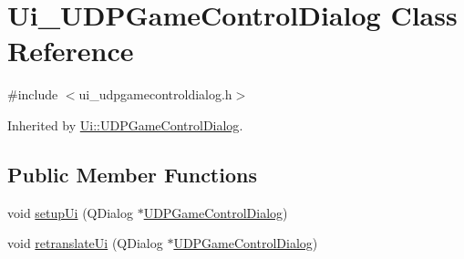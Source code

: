 \hypertarget{class_ui___u_d_p_game_control_dialog}{\section{Ui\-\_\-\-U\-D\-P\-Game\-Control\-Dialog Class Reference}
\label{class_ui___u_d_p_game_control_dialog}
}


{\ttfamily \#include $<$ui\-\_\-udpgamecontroldialog.\-h$>$}



Inherited by \hyperlink{class_ui_1_1_u_d_p_game_control_dialog}{Ui\-::\-U\-D\-P\-Game\-Control\-Dialog}.

\subsection*{Public Member Functions}
\begin{DoxyCompactItemize}
\item 
void \hyperlink{class_ui___u_d_p_game_control_dialog_ae9990764f178c7933c6a2cc020d6c36e}{setup\-Ui} (Q\-Dialog $\ast$\hyperlink{class_u_d_p_game_control_dialog}{U\-D\-P\-Game\-Control\-Dialog})
\item 
void \hyperlink{class_ui___u_d_p_game_control_dialog_a5decbe551cfe8e68dffc28f1bfa358c7}{retranslate\-Ui} (Q\-Dialog $\ast$\hyperlink{class_u_d_p_game_control_dialog}{U\-D\-P\-Game\-Control\-Dialog})
\end{DoxyCompactItemize}
